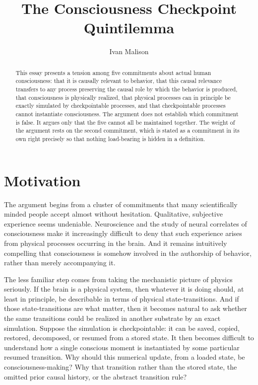 \documentclass[11pt]{article}
\title{The Consciousness Checkpoint Quintilemma}
\author{Ivan Malison}
\date{}
\begin{document}
\maketitle

\begin{abstract}
  This essay presents a tension among five commitments about actual human
  consciousness: that it is causally relevant to behavior, that this causal
  relevance transfers to any process preserving the causal role by which the
  behavior is produced, that consciousness is physically realized, that
  physical processes can in principle be exactly simulated by checkpointable
  processes, and that checkpointable processes cannot instantiate
  consciousness. The argument does not establish which commitment is false. It
  argues only that the five cannot all be maintained together. The weight of
  the argument rests on the second commitment, which is stated as a commitment
  in its own right precisely so that nothing load-bearing is hidden in a
  definition.
\end{abstract}

\section{Motivation}

The argument begins from a cluster of commitments that many scientifically
minded people accept almost without hesitation. Qualitative, subjective
experience seems undeniable. Neuroscience and the study of neural correlates of
consciousness make it increasingly difficult to deny that such experience
arises from physical processes occurring in the brain. And it remains
intuitively compelling that consciousness is somehow involved in the authorship
of behavior, rather than merely accompanying it.

The less familiar step comes from taking the mechanistic picture of physics
seriously. If the brain is a physical system, then whatever it is doing should,
at least in principle, be describable in terms of physical state-transitions.
And if those state-transitions are what matter, then it becomes natural to ask
whether the same transitions could be realized in another substrate by an exact
simulation. Suppose the simulation is checkpointable: it can be saved, copied,
restored, decomposed, or resumed from a stored state. It then becomes difficult
to understand how a single conscious moment is instantiated by some particular
resumed transition. Why should this numerical update, from a loaded state, be
consciousness-making? Why that transition rather than the stored state, the
omitted prior causal history, or the abstract transition rule?
\end{document}
